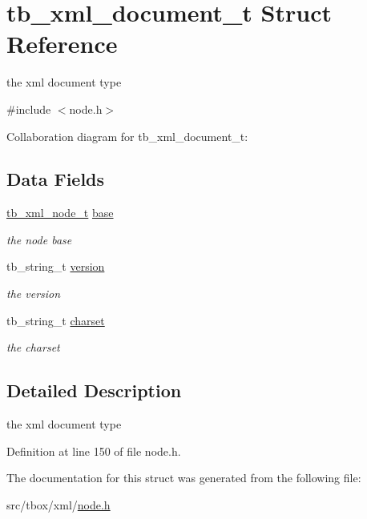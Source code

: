 \hypertarget{structtb__xml__document__t}{\section{tb\-\_\-xml\-\_\-document\-\_\-t Struct Reference}
\label{structtb__xml__document__t}
}


the xml document type  




{\ttfamily \#include $<$node.\-h$>$}



Collaboration diagram for tb\-\_\-xml\-\_\-document\-\_\-t\-:
\subsection*{Data Fields}
\begin{DoxyCompactItemize}
\item 
\hypertarget{structtb__xml__document__t_a629573620ea66b47ec35a2ee67821405}{\hyperlink{structtb__xml__node__t}{tb\-\_\-xml\-\_\-node\-\_\-t} \hyperlink{structtb__xml__document__t_a629573620ea66b47ec35a2ee67821405}{base}}\label{structtb__xml__document__t_a629573620ea66b47ec35a2ee67821405}

\begin{DoxyCompactList}\small\item\em the node base \end{DoxyCompactList}\item 
\hypertarget{structtb__xml__document__t_a11918b1e58ceef09cd6e02e70a5293be}{tb\-\_\-string\-\_\-t \hyperlink{structtb__xml__document__t_a11918b1e58ceef09cd6e02e70a5293be}{version}}\label{structtb__xml__document__t_a11918b1e58ceef09cd6e02e70a5293be}

\begin{DoxyCompactList}\small\item\em the version \end{DoxyCompactList}\item 
\hypertarget{structtb__xml__document__t_a404f02a17667398a8e4eb122af429572}{tb\-\_\-string\-\_\-t \hyperlink{structtb__xml__document__t_a404f02a17667398a8e4eb122af429572}{charset}}\label{structtb__xml__document__t_a404f02a17667398a8e4eb122af429572}

\begin{DoxyCompactList}\small\item\em the charset \end{DoxyCompactList}\end{DoxyCompactItemize}


\subsection{Detailed Description}
the xml document type 

Definition at line 150 of file node.\-h.



The documentation for this struct was generated from the following file\-:\begin{DoxyCompactItemize}
\item 
src/tbox/xml/\hyperlink{node_8h}{node.\-h}\end{DoxyCompactItemize}
